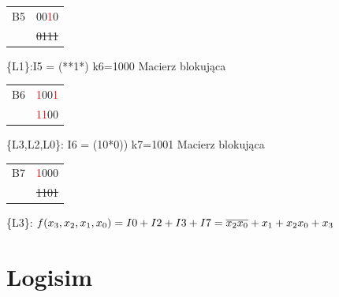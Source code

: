 \documentclass[]{article}
\begin{document}
\begin{tabular}[r]{|c|c|}
\hline
    B5 & 00\textcolor{red}{1}0  \\
      & \sout{0111} \\
 \hline 
\end{tabular}
\newline
\newline
\{L1\}:I5 = (**1*)
\newline
\newline
k6=1000
\newline
Macierz blokująca
\newline
\begin{tabular}[r]{|c|c|}
\hline
    B6 & \textcolor{red}{1}00\textcolor{red}{1} \\
       & \textcolor{red}{1}\textcolor{red}{1}00 \\
 \hline 
\end{tabular}
\newline
\newline
\{L3,L2,L0\}: I6 = (10*0))
\newline
\newline
k7=1001
\newline
Macierz blokująca
\newline
\begin{tabular}[r]{|c|c|}
\hline
    B7 & \textcolor{red}{1}000 \\
       & \sout{1101} \\
 \hline 
\end{tabular}
\newline
\newline
\{L3\}: 
\newline
\newline
$f(x\textsubscript{3},x\textsubscript{2},x\textsubscript{1},x\textsubscript{0})= I0 + I2 + I3 + I7 = \overline{x_{2}}\overline{x_{0}} + x\textsubscript{1} + x\textsubscript{2}x\textsubscript{0} + x\textsubscript{3}$
\section{Logisim}
\end{document}
